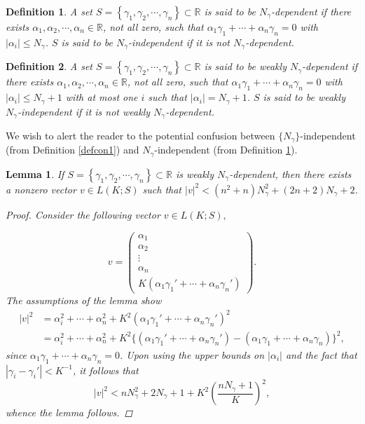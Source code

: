 \documentclass{article}
\newtheorem{Lem}{Lemma}
\newtheorem{defn}{Definition}
\numberwithin{equation}{section}
\begin{document}
\begin{defn}\label{lin-dep}
 A set $S = \left\{\gamma_1,\gamma_2, \cdots, \gamma_n\right\} \subset \mathbb{R}$ is said to be $N_\gamma$-dependent if there exists $\alpha_1,\alpha_2,\cdots,\alpha_n \in \mathbb{R}$, not all zero, such that $\alpha_1\gamma_1+\cdots+\alpha_n\gamma_n= 0$ with $|\alpha_i| \leq N_\gamma$. $S$ is said to be $N_\gamma$-independent if it is not $N_\gamma$-dependent.
\end{defn}

\begin{defn}\label{weak-lin-dep}
 A set $S = \left\{\gamma_1,\gamma_2, \cdots, \gamma_n\right\} \subset \mathbb{R}$ is said to be weakly $N_\gamma$-dependent if there exists $\alpha_1,\alpha_2,\cdots,\alpha_n \in \mathbb{R}$, not all zero, such that $\alpha_1\gamma_1+\cdots+\alpha_n\gamma_n= 0$ with $|\alpha_i| \leq N_\gamma+1$ with at most one $i$ such that $|\alpha_i| = N_\gamma+1$. $S$ is said to be weakly $N_\gamma$-independent if it is not weakly $N_\gamma$-dependent.
\end{defn}

We wish to alert the reader to the potential confusion between $\{N_\gamma\}$-independent (from Definition \ref{defcon1})  and $N_\gamma$-independent (from Definition  \ref{lin-dep}).

\begin{Lem}\label{cond1}
If $S = \left\{\gamma_1,\gamma_2, \cdots, \gamma_n\right\} \subset \mathbb{R}$ is weakly $N_\gamma$-dependent, then there exists a nonzero vector $v\in L(K;S)$ such that $|v|^2 < (n^2+n)N_{\gamma}^2+(2n+2)N_{\gamma}+2$.

\begin{proof}
Consider the following vector $v \in L(K;S),$

$$v=\left(\begin{array}{c}\alpha_1\\ \alpha_2 \\ \vdots \\ \alpha_n \\ K(\alpha_1\gamma_1'+\cdots+\alpha_n\gamma_n')\end{array}\right).$$
The assumptions of the lemma show
\begin{equation*}
\begin{split}
|v|^2&=\alpha_i^2+\cdots+\alpha_n^2+K^2(\alpha_1\gamma_1'+\cdots+\alpha_n\gamma_n')^2 \\
&= \alpha_i^2+\cdots+\alpha_n^2+K^2\{(\alpha_1\gamma_1'+\cdots+\alpha_n\gamma_n')-(\alpha_1\gamma_1+\cdots+\alpha_n\gamma_n)\}^{2}, 
\end{split}
\end{equation*}
since $\alpha_1\gamma_1+\cdots+\alpha_n\gamma_n= 0$. Upon using the upper bounds on $|\alpha_{i}|$ and the fact that $|\gamma_{i} - \gamma_{i}'| < K^{-1}$, it follows that
\begin{equation*}
|v|^{2} < nN_{\gamma}^2+2N_{\gamma}+1+K^2\left(\frac{nN_{\gamma}+1}{K}\right)^2,
\end{equation*}
whence the lemma follows.
\end{proof}

\end{Lem}
\end{document}
